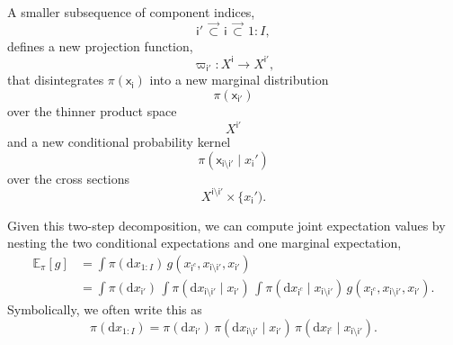\documentclass[
  letterpaper,
  DIV=11,
  numbers=noendperiod]{scrartcl}
\begin{document}
A smaller subsequence of component indices, \[
\mathsf{i}' \, \vec{\subset} \,
\mathsf{i}  \, \vec{\subset} \,
1:I,
\] defines a new projection function, \[
\varpi_{ \mathsf{i}' } :
X^{ \mathsf{i} } \rightarrow X^{ \mathsf{i}' },
\] that disintegrates \(\pi ( \mathsf{x}_{\mathsf{i}} )\) into a new
marginal distribution \[
\pi( \mathsf{x}_{ \mathsf{i'} } )
\] over the thinner product space \[
X^{ \mathsf{i}' }
\] and a new conditional probability kernel \[
\pi(
  \mathsf{x}_{ \mathsf{i} \setminus \mathsf{i}' } \mid
  x_{ \mathsf{i} }'
)
\] over the cross sections \[
X^{ \mathsf{i} \setminus \mathsf{i}' } \times
\{ x_{\mathsf{i}}'  ).
\]

Given this two-step decomposition, we can compute joint expectation
values by nesting the two conditional expectations and one marginal
expectation, \begin{align*}
\mathbb{E}_{\pi} [ g ]
&=
\int \pi( \mathrm{d} x_{1:I} ) \,
g(
  x_{\mathsf{i}^{c}},
  x_{\mathsf{i} \setminus \mathsf{i}'},
  x_{ \mathsf{i'} }
)
\\
&=
\int \pi( \mathrm{d} x_{ \mathsf{i'} } ) \,
\int \pi( \mathrm{d} x_{\mathsf{i} \setminus \mathsf{i}'} \mid
          x_{ \mathsf{i'} } ) \,
\int \pi( \mathrm{d} x_{\mathsf{i}^{c}} \mid
          x_{\mathsf{i} \setminus \mathsf{i}'} ) \,
g(
  x_{\mathsf{i}^{c}},
  x_{\mathsf{i} \setminus \mathsf{i}'},
  x_{ \mathsf{i'} }
).
\end{align*} Symbolically, we often write this as \[
\pi( \mathrm{d} x_{1:I} )
=
\pi( \mathrm{d} x_{ \mathsf{i'} } ) \,
\pi( \mathrm{d} x_{\mathsf{i} \setminus \mathsf{i}'} \mid
     x_{ \mathsf{i'} } ) \,
\pi( \mathrm{d} x_{\mathsf{i}^{c}} \mid
     x_{\mathsf{i} \setminus \mathsf{i}'} ).
\]
\end{document}
